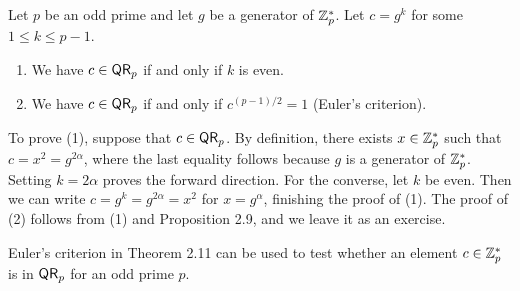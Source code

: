 \begin{thm}[Characterizations of $\QR_p$]
Let $p$ be an odd prime and let $g$ be a generator of $\mathbb{Z}_p^*$. Let $c = g^k$ for some $1 \leq k 
\leq p-1$.
\begin{enumerate}[(1)]
    \item We have $c \in {\sf QR}_p$ if and only if $k$ is even. 
    \item We have $c \in {\sf QR}_p$ if and only if $c^{(p-1)/2} = 1$ (Euler's criterion). 
\end{enumerate}
\end{thm}
\begin{pf}
To prove (1), suppose that $c \in {\sf QR}_p$. By definition, there exists $x \in \mathbb{Z}_p^*$ such that 
$c = x^2 = g^{2\alpha}$, where the last equality follows because $g$ is a generator of 
$\mathbb{Z}_p^*$. Setting $k = 2\alpha$ proves the forward direction. For the converse, let $k$ be even. 
Then we can write $c = g^k = g^{2\alpha} = x^2$ for $x = g^\alpha$, finishing the proof of (1). 
The proof of (2) follows from (1) and Proposition 2.9, and we leave it as an exercise.
\end{pf}

Euler's criterion in Theorem 2.11 can be used to test whether an element $c \in \mathbb{Z}_p^*$ 
is in $\QR_p$ for an odd prime $p$. 